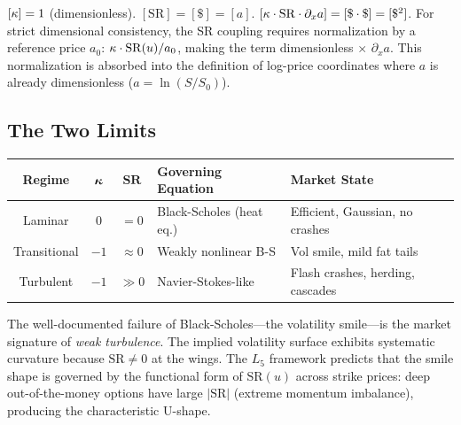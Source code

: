 \begin{remark}
$[\kappa] = 1$ (dimensionless). $[\mathrm{SR}] = [\$] = [a]$. $[\kappa \cdot \mathrm{SR} \cdot \partial_x a] = [\$ \cdot \$] = [\$^2]$. For strict dimensional consistency, the SR coupling requires normalization by a reference price $a_0$: $\kappa \cdot \mathrm{SR}(u)/a_0$, making the term dimensionless $\times$ $\partial_x a$. This normalization is absorbed into the definition of log-price coordinates where $a$ is already dimensionless ($a = \ln(S/S_0)$). \checkmark
\end{remark}

\subsection{The Two Limits}

\begin{center}
\begin{tabular}{@{}cccll@{}}
\toprule
\textbf{Regime} & $\boldsymbol{\kappa}$ & $\mathbf{SR}$ & \textbf{Governing Equation} & \textbf{Market State} \\
\midrule
Laminar & $0$ & $= 0$ & Black-Scholes (heat eq.) & Efficient, Gaussian, no crashes \\
Transitional & $-1$ & $\approx 0$ & Weakly nonlinear B-S & Vol smile, mild fat tails \\
Turbulent & $-1$ & $\gg 0$ & Navier-Stokes-like & Flash crashes, herding, cascades \\
\bottomrule
\end{tabular}
\end{center}

\begin{remark}
The well-documented failure of Black-Scholes---the volatility smile---is the market signature of \emph{weak turbulence}. The implied volatility surface exhibits systematic curvature because $\mathrm{SR} \neq 0$ at the wings. The $L_5$ framework predicts that the smile shape is governed by the functional form of $\mathrm{SR}(u)$ across strike prices: deep out-of-the-money options have large $|\mathrm{SR}|$ (extreme momentum imbalance), producing the characteristic U-shape.
\end{remark}

